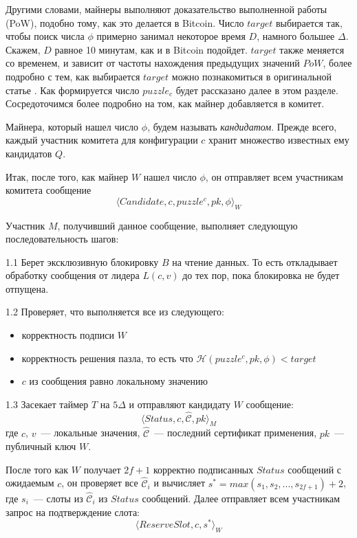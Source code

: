 Другими словами, майнеры выполняют доказательство выполненной работы (PoW), подобно тому, как это делается в Bitcoin.  Число $target$ выбирается так, чтобы поиск числа $\phi$ примерно занимал некоторое время $D$, намного большее $\Delta$. Скажем, $D$ равное 10 минутам, как и в Bitcoin подойдет.  $target$ также меняется со временем, и зависит от частоты нахождения предыдущих значений $PoW$, более подробно с тем, как выбирается $target$ можно познакомиться в оригинальной статье \cite{nakamoto}.
Как формируется число $puzzle_c$ будет рассказано далее в этом разделе. Сосредоточимся более подробно на том, как майнер добавляется в комитет.

Майнера, который нашел число $\phi$, будем называть \textit{кандидатом}.
Прежде всего, каждый участник комитета для конфигурации $c$ хранит множество известных ему кандидатов $Q$.
\vspace{10pt}

Итак, после того, как майнер $W$ нашел число $\phi$, он отправляет всем участникам комитета сообщение
 \[ \langle Candidate, c, puzzle^c, pk, \phi \rangle_W \]
 
Участник $M$, получивший данное сообщение, выполняет следующую последовательность шагов:

1.1 Берет эксклюзивную блокировку $B$ на чтение данных. То есть откладывает обработку сообщения от лидера $L(c, v)$ до тех пор, пока блокировка не будет отпущена. 

1.2 Проверяет, что выполняется все из следующего:
\begin{itemize}
\item корректность подписи $W$ 
\item корректность решения пазла, то есть что $\mathcal{H}(puzzle^c, pk, \phi) < target$
\item $c$ из сообщения равно локальному значению
\end{itemize}

1.3 Засекает таймер $T$ на $5\Delta$ и отправляют кандидату $W$ сообщение:
 \[ \langle Status, c, \hat{\mathcal{C}}, pk \rangle_M \]
где $c$, $v$~--- локальные значения, $\hat{\mathcal{C}}$~--- последний сертификат применения, $pk$~--- публичный ключ $W$.
\vspace{10pt}

После того как $W$ получает $2f+1$ корректно подписанных $Status$ сообщений с ожидаемым $c$, он проверяет все $\hat{\mathcal{C}}_i$ и вычисляет $s^{*}=max(s_1, s_2,..., s_{2f+1})+2$, где $s_i$~--- слоты из $\hat{\mathcal{C}}_i$ из $Status$ сообщений.
Далее отправляет всем участникам запрос на подтверждение слота:
 \[ \langle ReserveSlot, c, s^{*} \rangle_W \]
 
